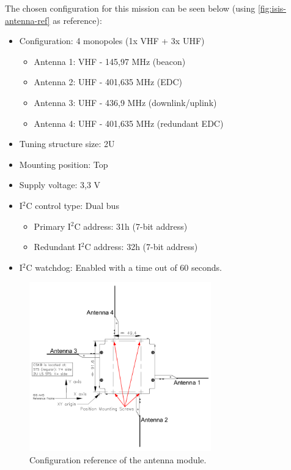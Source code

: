 The chosen configuration for this mission can be seen below (using \autoref{fig:isis-antenna-ref} as reference):

\begin{itemize}
    \item Configuration: 4 monopoles (1x VHF + 3x UHF)
        \begin{itemize}
            \item Antenna 1: VHF - 145,97 MHz (beacon)
            \item Antenna 2: UHF - 401,635 MHz (EDC)
            \item Antenna 3: UHF - 436,9 MHz (downlink/uplink)
            \item Antenna 4: UHF - 401,635 MHz (redundant EDC)
        \end{itemize}
    \item Tuning structure size: 2U
    \item Mounting position: Top
    \item Supply voltage: 3,3 V
    \item I$^{2}$C control type: Dual bus
        \begin{itemize}
            \item Primary I$^{2}$C address: 31h (7-bit address)
            \item Redundant I$^{2}$C address: 32h (7-bit address)
        \end{itemize}
    \item I$^{2}$C watchdog: Enabled with a time out of 60 seconds.
\end{itemize}

\begin{figure}[!ht]
    \begin{center}
        \includegraphics[width=0.7\textwidth]{figures/isis-antenna-ref}
        \caption{Configuration reference of the antenna module.}
        \label{fig:isis-antenna-ref}
    \end{center}
\end{figure}

